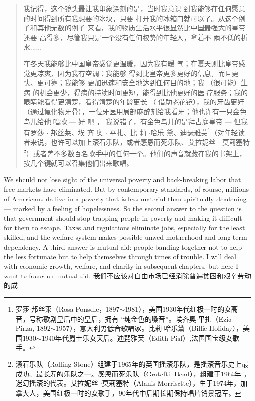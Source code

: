 \begin{paracol}{2}
\begin{quotation}
	
我记得，这个镜头最让我印象深刻的是，当时我意识
到我能够在任何愿意的时间得到所有我想要的冰块，只要
打开我的冰箱门就可以了。从这个例子和其他无数的例子
来看，我的物质生活水平很显然比中国最强大的皇帝还要
高得多，尽管我只是一个没有任何权势的年轻人，拿着不
兩不低的析水......
	
	
在冬天我能够比中国皇帝感觉更温暖，因为我有暖
气；在夏天则比皇帝感觉更凉爽，因为我有空调；我能够
得到比皇帝更多更好的信息，而且更快、更可靠；我能够
更加迅速和安全地达到任何目的地；我 （很可能）生病
的机会更少，得病的持续时间更短，能得到比他更好的医
疗服务；我的眼睛能看得更清楚，看得清楚的年龄更长
（ 借助老花镋），我的牙齿更好（通过氟化物牙骨），一位牙医用局部麻醉剂给我看牙；他也许有一只金色鸟儿给他
唱歌 --- 好 吧 ， 我说错了，有金色鸟儿的是拜占庭皇帝
--- 但我有罗莎 $\cdot$ 邦丝莱、埃 齐 奥 $\cdot$ 平扎、比 莉 $\cdot$哈乐
黛、迪瑟雅芙\footnote{罗莎$\cdot$邦丝莱（Rosa Ponsdle，1897$\sim$1981），美国1930年代红极一时的女高音，号称歌剧皇后中的皇后，拥有 “纯金色的嗓音”。埃齐奥$\cdot$平扎（Ezio Pinza, 1892$\sim$1957），意大利男低音歌唱家。比莉$\cdot$哈乐黛（Billie Holiday），美国1930$\sim$1940年代爵土乐女天后。迪琵雅芙（Edith Piaf）,法国国宝级女歌手。}（对年轻读者来说，也许可以加上滚石乐队，或者感恩而死乐队、艾拉妮丝 $\cdot$ 莫莉塞特\footnote{滚石乐队（Rolling Stone）组建于1965年的英国摇滚乐队，是摇滚音乐史上最成功、最长寿的乐队之一。感恩而死乐队（Gratcftil Dead），组建于1964年 ，迷幻摇滚的代表。艾拉妮丝 $\cdot$莫莉塞特（Alanis Morrisette），生于1974年，加拿大人，美国红极一时的女歌手，90年代中后期长期保持唱片销景冠军。}）或者差不多数百名歌手中的任何一个。他们的声音就藏在我的书架上，按几个键就可以召集他们出来歌唱。
\end{quotation}
\switchcolumn*
We should not lose sight of the universal poverty and back-breaking labor that free markets have eliminated. But by contemporary standards, of course, millions of Americans do live in
a poverty that is less material than spiritually deadening---
marked by a feeling of hopelessness. So the second answer to the question is that government should stop trapping people in
poverty and making it difficult for them to escape. Taxes and
regulations eliminate jobs, especially for the least skilled, and
the welfare system makes possible unwed motherhood and
long-term dependency. A third answer is mutual aid: people
banding together not to help the less fortunate but to help
themselves through times of trouble. I will deal with economic
growth, welfare, and charity in subsequent chapters, but here I
want to focus on mutual aid.
\switchcolumn
我们不应该对自由市场已经消除普遍贫困和艰辛劳动的成

\end{paracol}
